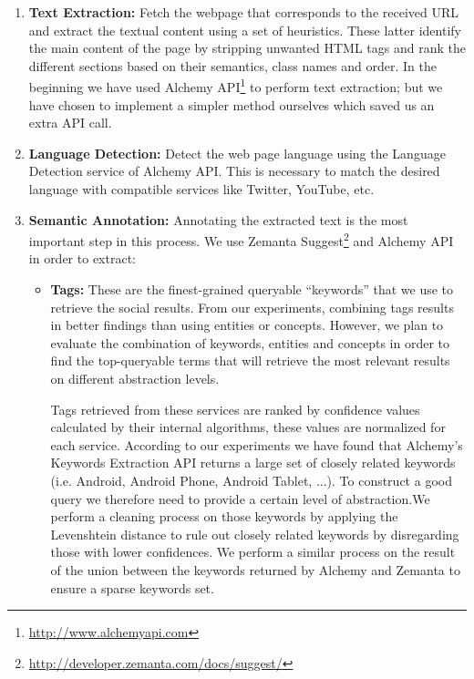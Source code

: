 \documentclass[oribibl]{../../Tools/LaTEX/llncs}
\begin{document}
\begin{enumerate}

\item {\bf Text Extraction:} Fetch the webpage that corresponds to the received URL and extract the textual content using a set of heuristics. These latter identify the main content of the page by stripping unwanted HTML tags and rank the different sections based on their semantics, class names and order. In the beginning we have used Alchemy API\footnote{\url{http://www.alchemyapi.com}} to perform text extraction; but we have chosen to implement a simpler method ourselves which saved us an extra API call.

\item {\bf Language Detection:} Detect the web page language using the Language Detection service of Alchemy API. This is necessary to match the desired language with compatible services like Twitter, YouTube, etc.

\item {\bf Semantic Annotation:} Annotating the extracted text is the most important step in this process. We use Zemanta Suggest\footnote{\url{http://developer.zemanta.com/docs/suggest/}} and Alchemy API in order to extract:

\begin{itemize}
\item {\bf Tags:} These are the finest-grained queryable ``keywords'' that we use to retrieve the social results. From our experiments, combining tags results in better findings than using entities or concepts. However, we plan to evaluate the combination of keywords, entities and concepts in order to find the top-queryable terms that will retrieve the most relevant results on different abstraction levels.

Tags retrieved from these services are ranked by confidence values calculated by their internal algorithms, these values are normalized for each service. According to our experiments we have found that Alchemy's Keywords Extraction API returns a large set of closely related keywords (i.e. Android, Android Phone, Android Tablet, ...). To construct a good query we therefore need to provide a certain level of abstraction.We perform a cleaning process on those keywords by applying the Levenshtein distance to rule out closely related keywords by disregarding those with lower confidences. We perform a similar process on the result of the union between the keywords returned by Alchemy and Zemanta to ensure a sparse keywords set.


\end{itemize}
\end{enumerate}
\end{document}
